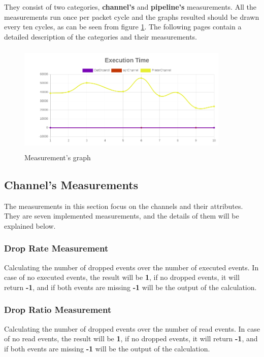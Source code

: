 They consist of two categories, \textbf{channel's} and \textbf{pipeline's} measurements. All the
measurements run once per packet cycle and the graphs resulted should be drawn every ten cycles,
as can be seen from figure \ref{fig:measurement_graph}. The following pages contain a detailed description
of the categories and their measurements.
\newline
\begin{figure}[H]
	\centering
	\includegraphics[width=0.9\textwidth,height=200px]{images/basic_graph.png}
	\caption{Measurement's graph}
	\label{fig:measurement_graph}
\end{figure}

\subsection{Channel's Measurements}
The measurements in this section focus on the channels and their attributes. They are seven implemented
measurements, and the details of them will be explained below.

\subsubsection{Drop Rate Measurement}
Calculating the number of dropped events over the number of executed events. In case of no executed events,
the result will be \textbf{1}, if no dropped events, it will return \textbf{-1}, and if both events are missing
\textbf{-1} will be the output of the calculation.

\subsubsection{Drop Ratio Measurement}
Calculating the number of dropped events over the number of read events. In case of no read events,
the result will be \textbf{1}, if no dropped events, it will return \textbf{-1}, and if both events are missing
\textbf{-1} will be the output of the calculation.
 

